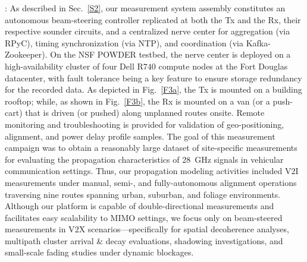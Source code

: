 \documentclass[12pt, draftcls, onecolumn]{IEEEtran}
\begin{document}
: As described in Sec.~\ref{S2}, our measurement system assembly constitutes an autonomous beam-steering controller replicated at both the Tx and the Rx, their respective sounder circuits, and a centralized nerve center for aggregation (via RPyC), timing synchronization (via NTP), and coordination (via Kafka-Zookeeper). On the NSF POWDER testbed, the nerve center is deployed on a high-availability cluster of four Dell R$740$ compute nodes at the Fort Douglas datacenter, with fault tolerance being a key feature to ensure storage redundancy for the recorded data. As depicted in Fig.~\ref{F3a}, the Tx is mounted on a building rooftop; while, as shown in Fig.~\ref{F3b}, the Rx is mounted on a van (or a push-cart) that is driven (or pushed) along unplanned routes onsite. Remote monitoring and troubleshooting is provided for validation of geo-positioning, alignment, and power delay profile samples. The goal of this measurement campaign was to obtain a reasonably large dataset of site-specific measurements for evaluating the propagation characteristics of \SI{28}{\giga\hertz} signals in vehicular communication settings. Thus, our propagation modeling activities included V$2$I measurements under manual, semi-, and fully-autonomous alignment operations traversing nine routes spanning urban, suburban, and foliage environments. Although our platform is capable of double-directional measurements and facilitates easy scalability to MIMO settings, we focus only on beam-steered measurements in V$2$X scenarios---specifically for spatial decoherence analyses, multipath cluster arrival \& decay evaluations, shadowing investigations, and small-scale fading studies under dynamic blockages.
\end{document}

